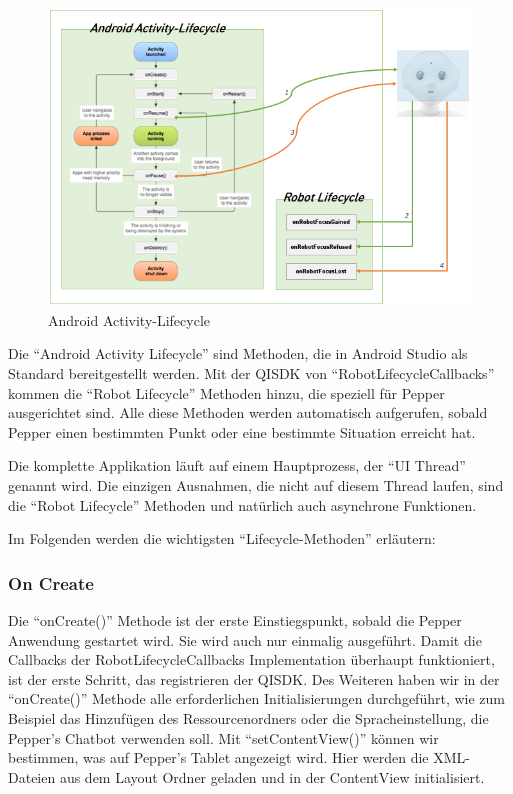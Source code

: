 \begin{figure}[H]
    \includegraphics[width=\textwidth]{Figures/AppChapter/4_1_3.png}
    \caption{Android Activity-Lifecycle}
    \label{fig:AAL}
    \centering
\end{figure}

Die ``Android Activity Lifecycle'' sind Methoden, die in Android Studio als Standard bereitgestellt werden. Mit der QISDK von 
``RobotLifecycleCallbacks'' kommen die ``Robot Lifecycle'' Methoden hinzu, die speziell für Pepper ausgerichtet sind. 
Alle diese Methoden werden automatisch aufgerufen, sobald Pepper einen bestimmten Punkt oder eine bestimmte Situation erreicht hat. 

Die komplette Applikation läuft auf einem Hauptprozess, der ``UI Thread'' genannt wird. Die einzigen Ausnahmen, die nicht auf diesem 
Thread laufen, sind die ``Robot Lifecycle'' Methoden und natürlich auch asynchrone Funktionen.

Im Folgenden werden die wichtigsten ``Lifecycle-Methoden'' erläutern:

\subsubsection{On Create} 

Die ``onCreate()'' Methode ist der erste Einstiegspunkt, sobald die Pepper Anwendung gestartet wird. Sie wird auch nur einmalig 
ausgeführt. Damit die Callbacks der RobotLifecycleCallbacks Implementation überhaupt funktioniert, ist der erste Schritt, das registrieren 
der QISDK. Des Weiteren haben wir in der ``onCreate()'' Methode alle erforderlichen Initialisierungen durchgeführt, wie zum Beispiel 
das Hinzufügen des Ressourcenordners oder die Spracheinstellung, die Pepper's Chatbot verwenden soll.
Mit ``setContentView()'' können wir bestimmen, was auf Pepper’s Tablet angezeigt wird. Hier werden die XML-Dateien aus dem Layout 
Ordner geladen und in der ContentView initialisiert. 

